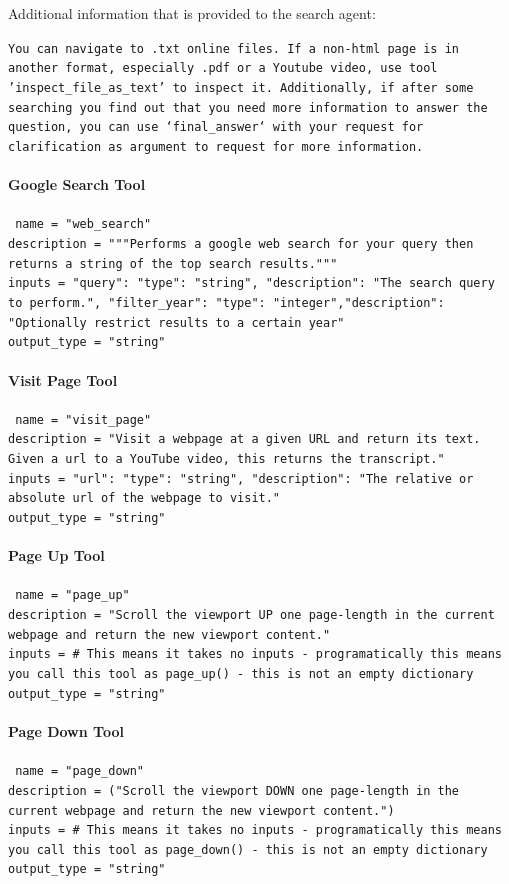 \documentclass[11pt]{article}
\begin{document}
Additional information that is provided to the search agent:

\texttt{You can navigate to .txt online files. If a non-html page is in another format, especially .pdf or a Youtube video, use tool 'inspect\_file\_as\_text' to inspect it. Additionally, if after some searching you find out that you need more information to answer the question, you can use `final\_answer` with your request for clarification as argument to request for more information.}

\paragraph{Google Search Tool}
\texttt{\
name = "web\_search"\\
description = """Performs a google web search for your query then returns a string of the top search results."""\\
inputs = {"query": {"type": "string", "description": "The search query to perform."},
"filter\_year": {"type": "integer","description": "Optionally restrict results to a certain year"}}\\
output\_type = "string"}

\paragraph{Visit Page Tool}

\texttt{\
name = "visit\_page"\\
description = "Visit a webpage at a given URL and return its text. Given a url to a YouTube video, this returns the transcript."\\
inputs = {"url": {"type": "string", "description": "The relative or absolute url of the webpage to visit."}}\\
output\_type = "string" }

\paragraph{Page Up Tool}
\texttt{\
name = "page\_up"\\
description = "Scroll the viewport UP one page-length in the current webpage and return the new viewport content."\\
inputs = {} \# This means it takes no inputs - programatically this means you call this tool as page\_up() - this is not an empty dictionary\\
output\_type = "string"}

\paragraph{Page Down Tool}
\texttt{\
\noindent name = "page\_down"\\
description = ("Scroll the viewport DOWN one page-length in the current webpage and return the new viewport content.")\\
inputs = {} \# This means it takes no inputs - programatically this means you call this tool as page\_down() - this is not an empty dictionary\\
output\_type = "string" }
\end{document}
